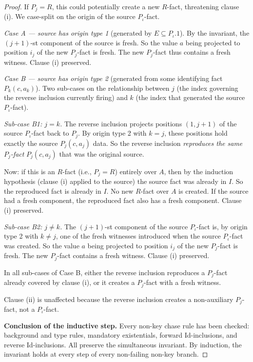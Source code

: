 \documentclass[10pt]{article}
\begin{document}
\begin{proof}
If \(P_j=R\), this could potentially create a new \(R\)-fact,
threatening clause (i).  We case-split on the origin of the source
\(P_\iota\)-fact.

\emph{Case A --- source has origin type 1} (generated by
\(E\subseteq P_\iota.1\)).
By the invariant, the \((j+1)\)-st component of the source is fresh.
So the value \(a\) being projected to position \(i_j\) of the new
\(P_j\)-fact is fresh.  The new \(P_j\)-fact thus contains a fresh
witness.  Clause (i) preserved.

\emph{Case B --- source has origin type 2} (generated from some
identifying fact \(P_k(c,a_k)\)).
Two sub-cases on the relationship between \(j\) (the index governing
the reverse inclusion currently firing) and \(k\) (the index that
generated the source \(P_\iota\)-fact).

\emph{Sub-case B1: \(j=k\).}
The reverse inclusion projects positions \((1,j+1)\) of the source
\(P_\iota\)-fact back to \(P_j\).  By origin type 2 with \(k=j\),
these positions hold exactly the source \(P_j(c,a_j)\) data.  So the
reverse inclusion \emph{reproduces the same \(P_j\)-fact}
\(P_j(c,a_j)\) that was the original source.

Now: if this is an \(R\)-fact (i.e., \(P_j=R\)) entirely over \(A\),
then by the induction hypothesis (clause (i) applied to the source)
the source fact was already in \(I\).  So the reproduced fact is
already in \(I\).  No new \(R\)-fact over \(A\) is created.
If the source had a fresh component, the reproduced fact also has a
fresh component.  Clause (i) preserved.

\emph{Sub-case B2: \(j\neq k\).}
The \((j+1)\)-st component of the source \(P_\iota\)-fact is, by
origin type 2 with \(k\neq j\), one of the fresh witnesses introduced
when the source \(P_\iota\)-fact was created.  So the value \(a\)
being projected to position \(i_j\) of the new \(P_j\)-fact is fresh.
The new \(P_j\)-fact contains a fresh witness.  Clause (i) preserved.

In all sub-cases of Case B, either the reverse inclusion reproduces a
\(P_j\)-fact already covered by clause (i), or it creates a
\(P_j\)-fact with a fresh witness.

Clause (ii) is unaffected because the reverse inclusion creates a
non-auxiliary \(P_j\)-fact, not a \(P_\iota\)-fact.

\smallskip\noindent\textbf{Conclusion of the inductive step.}
Every non-key chase rule has been checked: background and type rules,
mandatory existentials, forward Id-inclusions, and reverse
Id-inclusions.  All preserve the simultaneous invariant.  By
induction, the invariant holds at every step of every non-failing
non-key branch.


\end{proof}
\end{document}
